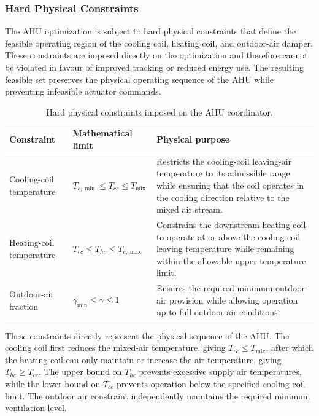 \documentclass[12pt, a4paper]{article}
\begin{document}
	\subsubsection{Hard Physical Constraints}
	
	The AHU optimization is subject to hard physical constraints that define the feasible operating region of the cooling coil, heating coil, and outdoor-air damper. These constraints are imposed directly on the optimization and therefore cannot be violated in favour of improved tracking or reduced energy use. The resulting feasible set preserves the physical operating sequence of the AHU while preventing infeasible actuator commands.
	
	\begin{table}[h!]
		\centering
		\caption{Hard physical constraints imposed on the AHU coordinator.}
		\label{tab:ahu_hard_constraints}
		\renewcommand{\arraystretch}{1.25}
		\begin{tabular}{p{} p{} p{}}
			\toprule
			\textbf{Constraint} & \textbf{Mathematical limit} & \textbf{Physical purpose} \\
			\midrule
			Cooling-coil temperature
			&
			$T_{c,\min} \leq T_{cc} \leq T_{\mathrm{mix}}$
			&
			Restricts the cooling-coil leaving-air temperature to its admissible range while ensuring that the coil operates in the cooling direction relative to the mixed air stream.
			\\
			
			Heating-coil temperature
			&
			$T_{cc} \leq T_{hc} \leq T_{c,\max}$
			&
			Constrains the downstream heating coil to operate at or above the cooling coil leaving temperature while remaining within the allowable upper temperature limit.
			\\
			
			Outdoor-air fraction
			&
			$\gamma_{\min} \leq \gamma \leq 1$
			&
			Ensures the required minimum outdoor-air provision while allowing operation up to full outdoor-air conditions.
			\\
			\bottomrule
		\end{tabular}
	\end{table}
	
	These constraints directly represent the physical sequence of the AHU. The cooling coil first reduces the mixed-air temperature, giving $T_{cc} \leq T_{\mathrm{mix}}$, after which the heating coil can only maintain or increase the air temperature, giving $T_{hc} \geq T_{cc}$. The upper bound on $T_{hc}$ prevents excessive supply air temperatures, while the lower bound on $T_{cc}$ prevents operation below the specified cooling coil limit. The outdoor air constraint independently maintains the required minimum ventilation level.
\end{document}
